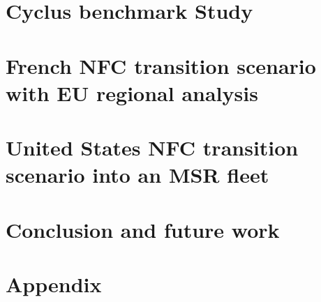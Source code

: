\documentclass[edeposit,fullpage]{uiucthesis2014}
\begin{document}
\chapter{Cyclus benchmark Study}


\FloatBarrier



\chapter{French \gls{NFC} transition scenario with \gls{EU} regional analysis}



\chapter{United States \gls{NFC} transition scenario into an \gls{MSR} fleet}


\chapter{Conclusion and future work}


\chapter*{Appendix}


\backmatter



\end{document}
